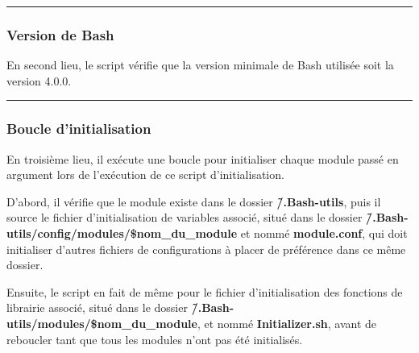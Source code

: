 \documentclass[a4paper,10pt]{article}
\begin{document}

\color{blue}\par\noindent\rule{\textwidth}{0.4pt}\color{white}

\color{blue}
\subsubsection{Version de Bash}\color{white}

\begin{justify}
    En second lieu, le script vérifie que la version minimale de Bash utilisée soit la version 4.0.0.
\end{justify}



\color{blue}\par\noindent\rule{\textwidth}{0.4pt}\color{white}

\color{blue}
\subsubsection{Boucle d'initialisation}\color{white}

\begin{justify}
    En troisième lieu, il exécute une boucle pour initialiser chaque module passé en argument lors de l'exécution de ce script d'initialisation.
\end{justify}

\begin{justify}
    D'abord, il vérifie que le module existe dans le dossier \textbf{\color{lime}\~/.Bash-utils}, puis il source le fichier d'initialisation de variables associé, situé dans le dossier \textbf{\color{lime}\~/.Bash-utils/config/modules/\color{orange}\$nom\_du\_module} et nommé \textbf{\color{lime}module.conf}, qui doit initialiser d'autres fichiers de configurations à placer de préférence dans ce même dossier.
\end{justify}

\begin{justify}
    Ensuite, le script en fait de même pour le fichier d'initialisation des fonctions de librairie associé, situé dans le dossier \textbf{\color{lime}\~/.Bash-utils/modules/\$nom\_du\_module}, et nommé \textbf{\color{lime}Initializer.sh}, avant de reboucler tant que tous les modules n'ont pas été initialisés.
\end{justify}

\end{document}

